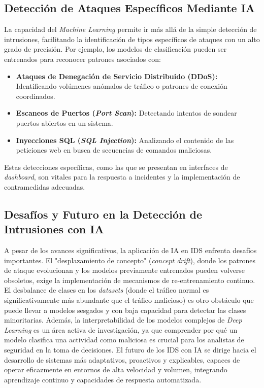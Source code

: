 \subsection{Detección de Ataques Específicos Mediante IA}
La capacidad del \textit{Machine Learning} permite ir más allá de la simple detección de intrusiones, facilitando la identificación de tipos específicos de ataques con un alto grado de precisión. Por ejemplo, los modelos de clasificación pueden ser entrenados para reconocer patrones asociados con:
\begin{itemize}
\item \textbf{Ataques de Denegación de Servicio Distribuido (DDoS):} Identificando volúmenes anómalos de tráfico o patrones de conexión coordinados.
\item \textbf{Escaneos de Puertos (\textit{Port Scan}):} Detectando intentos de sondear puertos abiertos en un sistema.
\item \textbf{Inyecciones SQL (\textit{SQL Injection}):} Analizando el contenido de las peticiones web en busca de secuencias de comandos maliciosas.
\end{itemize}
Estas detecciones específicas, como las que se presentan en interfaces de \textit{dashboard}, son vitales para la respuesta a incidentes y la implementación de contramedidas adecuadas.

\subsection{Desafíos y Futuro en la Detección de Intrusiones con IA}
A pesar de los avances significativos, la aplicación de IA en IDS enfrenta desafíos importantes. El "desplazamiento de concepto" (\textit{concept drift}), donde los patrones de ataque evolucionan y los modelos previamente entrenados pueden volverse obsoletos, exige la implementación de mecanismos de re-entrenamiento continuo. El desbalance de clases en los \textit{datasets} (donde el tráfico normal es significativamente más abundante que el tráfico malicioso) es otro obstáculo que puede llevar a modelos sesgados y con baja capacidad para detectar las clases minoritarias. Además, la interpretabilidad de los modelos complejos de \textit{Deep Learning} es un área activa de investigación, ya que comprender por qué un modelo clasifica una actividad como maliciosa es crucial para los analistas de seguridad en la toma de decisiones. El futuro de los IDS con IA se dirige hacia el desarrollo de sistemas más adaptativos, proactivos y explicables, capaces de operar eficazmente en entornos de alta velocidad y volumen, integrando aprendizaje continuo y capacidades de respuesta automatizada.

